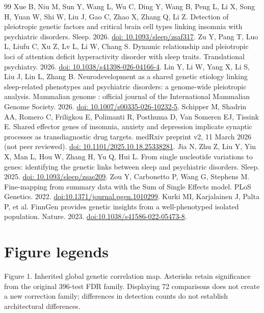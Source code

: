 \documentclass[11pt]{article}
\begin{document}
\begin{thebibliography}{99}
 Xue B, Niu M, Sun Y, Wang L, Wu C, Ding Y, Wang B, Peng L, Li X, Song H, Yuan W, Shi W, Liu J, Gao C, Zhao X, Zhang Q, Li Z. Detection of pleiotropic genetic factors and critical brain cell types linking insomnia with psychiatric disorders. Sleep. 2026. \href{https://doi.org/10.1093/sleep/zsaf317}{doi: 10.1093/sleep/zsaf317}.
 Zu Y, Pang T, Luo L, Liufu C, Xu Z, Lv L, Li W, Chang S. Dynamic relationship and pleiotropic loci of attention deficit hyperactivity disorder with sleep traits. Translational psychiatry. 2026. \href{https://doi.org/10.1038/s41398-026-04166-4}{doi: 10.1038/s41398-026-04166-4}.
 Lin Y, Li W, Yang X, Li S, Liu J, Lin L, Zhang B. Neurodevelopment as a shared genetic etiology linking sleep-related phenotypes and psychiatric disorders: a genome-wide pleiotropic analysis. Mammalian genome : official journal of the International Mammalian Genome Society. 2026. \href{https://doi.org/10.1007/s00335-026-10232-5}{doi: 10.1007/s00335-026-10232-5}.
 Schipper M, Shadrin AA, Romero C, Friligkou E, Polimanti R, Posthuma D, Van Someren EJ, Tissink E. Shared effector genes of insomnia, anxiety and depression implicate synaptic processes as transdiagnostic drug targets. medRxiv preprint v2, 11 March 2026 (not peer reviewed). \href{https://doi.org/10.1101/2025.10.18.25338281}{doi: 10.1101/2025.10.18.25338281}.
 Jia N, Zhu Z, Liu Y, Yin X, Man L, Hou W, Zhang H, Yu Q, Hui L. From single nucleotide variations to genes: identifying the genetic links between sleep and psychiatric disorders. Sleep. 2025. \href{https://doi.org/10.1093/sleep/zsae209}{doi: 10.1093/sleep/zsae209}.
 Zou Y, Carbonetto P, Wang G, Stephens M. Fine-mapping from summary data with the Sum of Single Effects model. PLoS Genetics. 2022. \href{https://doi.org/10.1371/journal.pgen.1010299}{doi:10.1371/journal.pgen.1010299}.
 Kurki MI, Karjalainen J, Palta P, et al. FinnGen provides genetic insights from a well-phenotyped isolated population. Nature. 2023. \href{https://doi.org/10.1038/s41586-022-05473-8}{doi:10.1038/s41586-022-05473-8}.
\end{thebibliography}
\section*{Figure legends}
Figure 1. Inherited global genetic correlation map. Asterisks retain significance from the original 396-test FDR family. Displaying 72 comparisons does not create a new correction family; differences in detection counts do not establish architectural differences.
\end{document}

